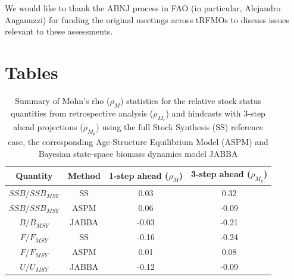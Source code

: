 \documentclass[12pt,halfline,a4paper,nonumbib]{ouparticle}
\begin{document}
We would like to thank the ABNJ process in FAO (in particular, Alejandro Anganuzzi) for funding the original meetings across tRFMOs to discuss issues relevant to these assessments. 

\clearpage
\newpage
\printbibliography


\clearpage
\newpage
\section{Tables}


\begin{table}[!ht]
\caption{Summary of Mohn's rho ($\rho_{M}$) statistics for the relative stock status quantities from retrospective analysis ($\rho_{M_r}$) and hindcasts with 3-step ahead projections ($\rho_{M_p}$) using the full Stock Synthesis (SS) reference case, the corresponding Age-Structure Equilibrium Model (ASPM) and Bayesian state-space biomass dynamics model JABBA}  
\begin{center}
\label{tab:retro-rho}
\begin{tabular}{|cccc|}
\hline
{\small Quantity} & \small Method & {\small 1-step ahead ($\rho_{M}$)} & {\small 3-step ahead ($\rho_{M_p}$)} \\ 
\hline\hline
{\small $SSB/SSB_{MSY}$     } & {\small SS} 	 & {\small    0.03} & {\small  0.32}      \\
{\small $SSB/SSB_{MSY}$     } & {\small ASPM} 	 & {\small    0.06} & {\small -0.09}      \\
{\small $B/B_{MSY}$         } & {\small JABBA} 	 & {\small   -0.03} & {\small -0.21}      \\
{\small $F/F_{MSY}$         } & {\small SS} 	 & {\small   -0.16} & {\small -0.24}      \\
{\small $F/F_{MSY}$         } & {\small ASPM} 	 & {\small    0.01} & {\small  0.08}      \\
{\small $U/U_{MSY}$         } & {\small JABBA} 	 & {\small   -0.12} & {\small -0.09}      \\
\hline
\end{tabular}
\end{center}
\end{table}
\end{document}
